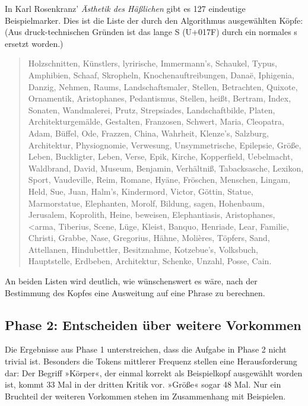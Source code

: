 \documentclass{article}
\newcommand*{\lit}{\textit}%
\begin{document}
In Karl Rosenkranz' \lit{Ästhetik des
  Häßlichen} \parencite{Rosenkranz1853a} gibt es 127 eindeutige
Beispielmarker. Dies ist die Liste der durch den Algorithmus
ausgewählten Köpfe: (Aus druck-technischen Gründen ist das lange S
(U+017F) durch ein normales s ersetzt worden.)

\begin{quote}
  Holzschnitten, Künstlers, lyrirische, Immermann's, Schaukel, Typus,
  Amphibien, Schaaf, Skropheln, Knochenauftreibungen, Danaë,
  Iphigenia, Danzig, Nehmen, Raums, Landschaftsmaler, Stellen,
  Betrachten, Quixote, Ornamentik, Aristophanes, Pedantismus, Stellen,
  heißt, Bertram, Index, Sonaten, Wandmalerei, Prutz, Strepsiades,
  Landschaftbilde, Platen, Architekturgemälde, Gestalten, Franzosen,
  Schwert, Maria, Cleopatra, Adam, Büffel, Ode, Frazzen, China,
  Wahrheit, Klenze's, Salzburg, Architektur, Physiognomie, Verwesung,
  Unsymmetrische, Epilepsie, Größe, Leben, Buckligter, Leben, Verse,
  Epik, Kirche, Kopperfield, Uebelmacht, Waldbrand, David, Museum,
  Benjamin, Verhältniß, Tabacksasche, Lexikon, Sport, Vaudeville,
  Reim, Romane, Hyäne, Fröschen, Menschen, Lingam, Held, Sue, Juan,
  Halm's, Kindermord, Victor, Göttin, Statue, Marmorstatue,
  Elephanten, Morolf, Bildung, sagen, Hohenbaum, Jerusalem, Koprolith,
  Heine, beweisen, Elephantiasis, Aristophanes,
  \foreignlanguage{polutonikogreek}{<arma}, %
  Tiberius, Scene, Lüge, Kleist, Banquo, Henriade, Lear, Familie,
  Christi, Grabbe, Nase, Gregorius, Hähne, Molières, Töpfers, Sand,
  Attellanen, Hindubettler, Besitznahme, Kotzebue's, Volksbuch,
  Hauptstelle, Erdbeben, Architektur, Schenke, Unzahl, Posse, Cain.
\end{quote}

An beiden Listen wird deutlich, wie wünschenswert es wäre, nach der
Bestimmung des Kopfes eine Ausweitung auf eine Phrase zu berechnen.

\subsection{Phase 2: Entscheiden über weitere Vorkommen}

Die Ergebnisse aus Phase 1 unterstreichen, dass die Aufgabe in Phase 2
nicht trivial ist. Besonders die Tokens mittlerer Frequenz stellen
eine Herausforderung dar: Der Begriff »Körper«, der einmal korrekt als
Beispielkopf ausgewählt worden ist, kommt 33 Mal in der dritten Kritik
vor. »Größe« sogar 48 Mal. Nur ein Bruchteil der weiteren Vorkommen
stehen im Zusammenhang mit Beispielen.
\end{document}
